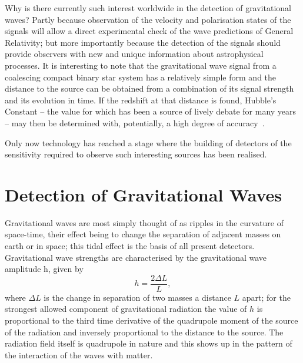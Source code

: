 \documentclass{article}
\begin{document}
Why is there currently such interest worldwide in the detection of gravitational
waves? Partly because observation of the velocity and polarisation states of the
signals will allow a direct experimental check of the wave predictions of
General Relativity; but more importantly because the detection of the signals
should provide observers with new and unique information about astrophysical
processes. It is interesting to note that the gravitational wave signal from a
coalescing compact binary star system has a relatively simple form and the
distance to the source can be obtained from a combination of its signal strength
and its evolution in time. If the redshift at that distance is found, Hubble's
Constant -- the value for which has been a source of lively debate for many
years -- may then be determined with, potentially, a high degree of
accuracy~\cite{Schutz}.

Only now technology has reached a stage where the building of detectors of the
sensitivity required to observe such interesting sources has been realised.




\newpage

\section{Detection of Gravitational Waves}
\label{section:Detection}

Gravitational waves are most simply thought of as ripples in the curvature of
space-time, their effect being to change the separation of adjacent masses on
earth or in space; this tidal effect is the basis of all present detectors.
Gravitational wave strengths are characterised by the gravitational wave
amplitude h, given by
%
\begin{equation}
  h = \frac{2 \Delta L} L,
  \label{equation:h}
\end{equation}
%
where $\Delta L$ is the change in separation of two masses a distance $L$ apart;
for the strongest allowed component of gravitational radiation the value of $h$
is proportional to the third time derivative of the quadrupole moment of the
source of the radiation and inversely proportional to the distance to the
source. The radiation field itself is quadrupole in nature and this shows up in
the pattern of the interaction of the waves with matter.
\end{document}
